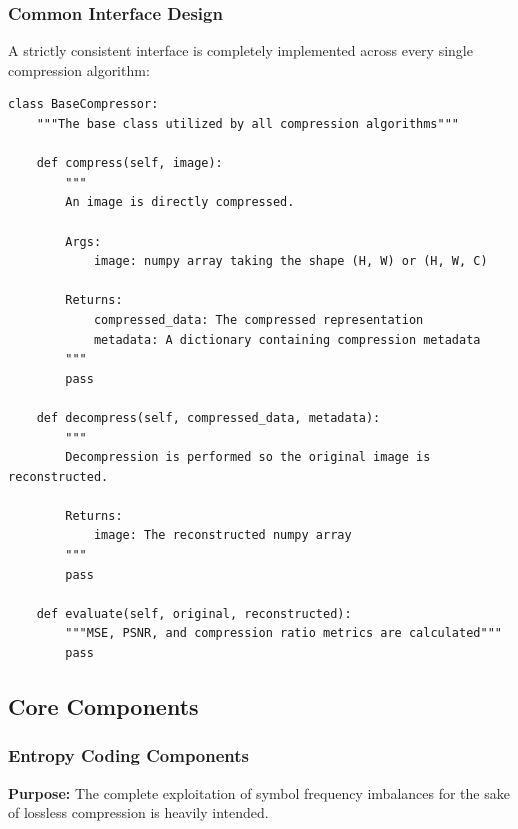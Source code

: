 \subsubsection{Common Interface Design}

A strictly consistent interface is completely implemented across every single compression algorithm:

\begin{verbatim}
class BaseCompressor:
    """The base class utilized by all compression algorithms"""
    
    def compress(self, image):
        """
        An image is directly compressed.
        
        Args:
            image: numpy array taking the shape (H, W) or (H, W, C)
            
        Returns:
            compressed_data: The compressed representation
            metadata: A dictionary containing compression metadata
        """
        pass
    
    def decompress(self, compressed_data, metadata):
        """
        Decompression is performed so the original image is reconstructed.
        
        Returns:
            image: The reconstructed numpy array
        """
        pass
    
    def evaluate(self, original, reconstructed):
        """MSE, PSNR, and compression ratio metrics are calculated"""
        pass
\end{verbatim}



\subsection{Core Components}

\subsubsection{Entropy Coding Components}

\textbf{Purpose:} The complete exploitation of symbol frequency imbalances for the sake of lossless compression is heavily intended.

